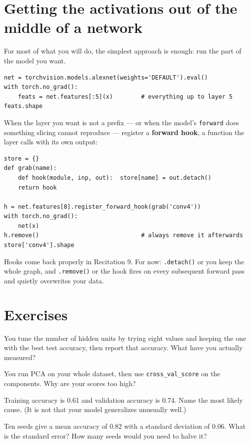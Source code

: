 \documentclass[11pt]{article}
\begin{document}
\section{Getting the activations out of the middle of a network}

For most of what you will do, the simplest approach is enough: run the part of
the model you want.

\begin{lstlisting}
net = torchvision.models.alexnet(weights='DEFAULT').eval()
with torch.no_grad():
    feats = net.features[:5](x)        # everything up to layer 5
feats.shape
\end{lstlisting}

When the layer you want is not a prefix --- or when the model's \texttt{forward}
does something slicing cannot reproduce --- register a \textbf{forward hook}, a
function the layer calls with its own output:

\begin{lstlisting}
store = {}
def grab(name):
    def hook(module, inp, out):  store[name] = out.detach()
    return hook

h = net.features[8].register_forward_hook(grab('conv4'))
with torch.no_grad():
    net(x)
h.remove()                             # always remove it afterwards
store['conv4'].shape
\end{lstlisting}

Hooks come back properly in Recitation 9. For now: \texttt{.detach()} or you keep
the whole graph, and \texttt{.remove()} or the hook fires on every subsequent
forward pass and quietly overwrites your data.

\section{Exercises}

 You tune the number of hidden units by trying eight values and keeping
the one with the best test accuracy, then report that accuracy. What have you
actually measured?

 You run PCA on your whole dataset, then use \texttt{cross\_val\_score}
on the components. Why are your scores too high?

 Training accuracy is 0.61 and validation accuracy is 0.74. Name the
most likely cause. (It is not that your model generalizes unusually well.)

 Ten seeds give a mean accuracy of 0.82 with a standard deviation of
0.06. What is the standard error? How many seeds would you need to halve it?
\end{document}

